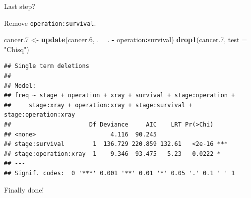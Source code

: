 \documentclass[ignorenonframetext,]{beamer}
\newenvironment{Shaded}{\begin{snugshade}}{\end{snugshade}}
\newcommand{\DataTypeTok}[1]{\textcolor[rgb]{0.13,0.29,0.53}{#1}}
\newcommand{\FloatTok}[1]{\textcolor[rgb]{0.00,0.00,0.81}{#1}}
\newcommand{\KeywordTok}[1]{\textcolor[rgb]{0.13,0.29,0.53}{\textbf{#1}}}
\newcommand{\NormalTok}[1]{#1}
\newcommand{\OperatorTok}[1]{\textcolor[rgb]{0.81,0.36,0.00}{\textbf{#1}}}
\newcommand{\StringTok}[1]{\textcolor[rgb]{0.31,0.60,0.02}{#1}}
\begin{document}
\begin{frame}[fragile]{Last step?}
\protect\hypertarget{last-step}{}

Remove \texttt{operation:survival}.

\footnotesize

\begin{Shaded}
\begin{Highlighting}[]
\NormalTok{cancer}\FloatTok{.7}\NormalTok{ <-}\StringTok{ }\KeywordTok{update}\NormalTok{(cancer}\FloatTok{.6}\NormalTok{, . }\OperatorTok{~}\StringTok{ }\NormalTok{. }\OperatorTok{-}\StringTok{ }\NormalTok{operation}\OperatorTok{:}\NormalTok{survival)}
\KeywordTok{drop1}\NormalTok{(cancer}\FloatTok{.7}\NormalTok{, }\DataTypeTok{test =} \StringTok{"Chisq"}\NormalTok{)}
\end{Highlighting}
\end{Shaded}

\begin{verbatim}
## Single term deletions
## 
## Model:
## freq ~ stage + operation + xray + survival + stage:operation + 
##     stage:xray + operation:xray + stage:survival + stage:operation:xray
##                      Df Deviance     AIC    LRT Pr(>Chi)    
## <none>                     4.116  90.245                    
## stage:survival        1  136.729 220.859 132.61   <2e-16 ***
## stage:operation:xray  1    9.346  93.475   5.23   0.0222 *  
## ---
## Signif. codes:  0 '***' 0.001 '**' 0.01 '*' 0.05 '.' 0.1 ' ' 1
\end{verbatim}

\normalsize

Finally done!

\end{frame}
\end{document}
